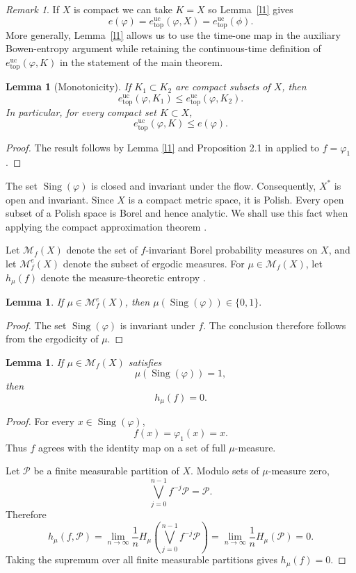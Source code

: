 \documentclass[11pt,reqno]{amsart}
\newtheorem{lemma}[theorem]{Lemma}
\theoremstyle{definition}
\theoremstyle{remark}
\newtheorem{remark}[theorem]{Remark}
\newcommand{\cM}{\mathcal{M}}
\newcommand{\Sing}{\operatorname{Sing}}
\newcommand{\hE}{e^{\mathrm{uc}}_{\mathrm{top}}}
\begin{document}
\begin{remark}
If $X$ is compact we can take $K=X$ so Lemma~\ref{l1} gives
\[
e(\varphi)=\hE(\varphi,X)=\hE(\phi).
\]
More generally, Lemma~\ref{l1} allows us to use
the time-one map in the auxiliary Bowen-entropy argument while retaining
the continuous-time definition of $\hE(\varphi,K)$ in the statement of
the main theorem.
\end{remark}

\begin{lemma}[Monotonicity]
\label{l2}
If $K_1\subset K_2$ are compact subsets of $X$, then
\[
\hE(\varphi,K_1)\leq\hE(\varphi,K_2).
\]
In particular, for every compact set $K\subset X$,
\[
\hE(\varphi,K)\leq e(\varphi).
\]
\end{lemma}

\begin{proof}
The result follows by Lemma \ref{l1} and Proposition 2.1 in \cite{fh} applied to $f=\varphi_1$.
\end{proof}

The set $\Sing(\varphi)$ is closed and invariant under the flow.
Consequently, $X^*$ is open and invariant.
Since $X$ is a compact metric space, it is Polish. Every open subset of
a Polish space is Borel and hence analytic. We shall use this fact when
applying the compact approximation theorem \cite{fh}.

Let $\cM_f(X)$ denote the set of $f$-invariant Borel probability
measures on $X$, and let $\cM_f^e(X)$ denote the subset of ergodic
measures. For $\mu\in\cM_f(X)$, let $h_\mu(f)$ denote the
measure-theoretic entropy \cite{w}.

\begin{lemma}\label{l3}
If $\mu\in\cM_f^e(X)$, then
$
\mu(\Sing(\varphi))\in\{0,1\}.
$
\end{lemma}

\begin{proof}
The set $\Sing(\varphi)$ is invariant under $f$. The conclusion therefore
follows from the ergodicity of $\mu$.
\end{proof}

\begin{lemma}
\label{l4}
If $\mu\in\cM_f(X)$ satisfies
\[
\mu(\Sing(\varphi))=1,
\]
then
\[
h_\mu(f)=0.
\]
\end{lemma}

\begin{proof}
For every $x\in\Sing(\varphi)$,
\[
f(x)=\varphi_1(x)=x.
\]
Thus $f$ agrees with the identity map on a set of full $\mu$-measure.

Let $\mathcal{P}$ be a finite measurable partition of $X$. Modulo sets
of $\mu$-measure zero,
\[
\bigvee_{j=0}^{n-1}f^{-j}\mathcal{P}
=
\mathcal{P}.
\]
Therefore
\[
h_\mu(f,\mathcal{P})
=
\lim_{n\to\infty}
\frac{1}{n}
H_\mu\left(
\bigvee_{j=0}^{n-1}f^{-j}\mathcal{P}
\right)
=
\lim_{n\to\infty}\frac{1}{n}H_\mu(\mathcal{P})
=
0.
\]
Taking the supremum over all finite measurable partitions gives
$h_\mu(f)=0$.
\end{proof}
\end{document}

